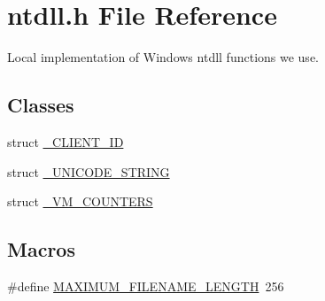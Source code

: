 \section{ntdll.\-h File Reference}
\label{ntdll_8h}


Local implementation of Windows ntdll functions we use.  


\subsection*{Classes}
\begin{DoxyCompactItemize}
\item 
struct \hyperlink{struct___c_l_i_e_n_t___i_d}{\-\_\-\-C\-L\-I\-E\-N\-T\-\_\-\-I\-D}
\item 
struct \hyperlink{struct___u_n_i_c_o_d_e___s_t_r_i_n_g}{\-\_\-\-U\-N\-I\-C\-O\-D\-E\-\_\-\-S\-T\-R\-I\-N\-G}
\item 
struct \hyperlink{struct___v_m___c_o_u_n_t_e_r_s}{\-\_\-\-V\-M\-\_\-\-C\-O\-U\-N\-T\-E\-R\-S}
\end{DoxyCompactItemize}
\subsection*{Macros}
\begin{DoxyCompactItemize}
\item 
\#define \hyperlink{ntdll_8h_a4fc6529ce775df5fb3ceff4e7674db71}{M\-A\-X\-I\-M\-U\-M\-\_\-\-F\-I\-L\-E\-N\-A\-M\-E\-\_\-\-L\-E\-N\-G\-T\-H}~256
\end{DoxyCompactItemize}

